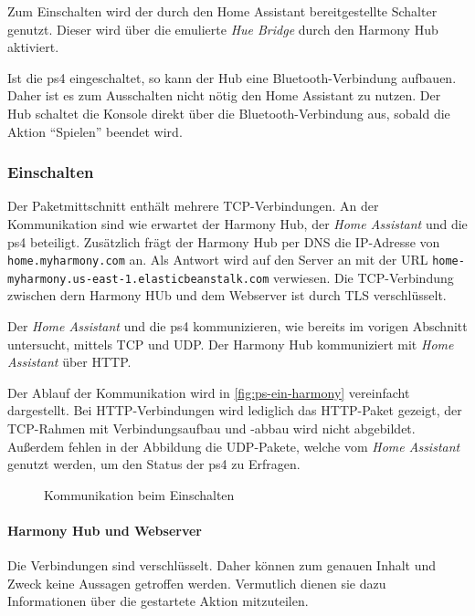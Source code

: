 Zum Einschalten wird der durch den Home Assistant bereitgestellte Schalter genutzt.
Dieser wird über die emulierte \textit{Hue Bridge} durch den Harmony Hub aktiviert.

Ist die \ac{ps4} eingeschaltet, so kann der Hub eine Bluetooth-Verbindung aufbauen.
Daher ist es zum Ausschalten nicht nötig den Home Assistant zu nutzen.
Der Hub schaltet die Konsole direkt über die Bluetooth-Verbindung aus,
sobald die Aktion \enquote{Spielen} beendet wird.

\subsubsection{Einschalten}
Der Paketmittschnitt enthält mehrere TCP-Verbindungen.
An der Kommunikation sind wie erwartet der Harmony Hub, der \textit{Home Assistant} und die \ac{ps4} beteiligt.
Zusätzlich frägt der Harmony Hub per DNS die IP-Adresse von \nolinkurl{home.myharmony.com} an.
Als Antwort wird auf den Server an mit der URL \nolinkurl{home-myharmony.us-east-1.elasticbeanstalk.com} verwiesen.
Die TCP-Verbindung zwischen dern Harmony HUb und dem Webserver ist durch TLS verschlüsselt.

Der \textit{Home Assistant} und die \ac{ps4} kommunizieren, wie bereits im vorigen Abschnitt untersucht, mittels TCP und UDP.
Der Harmony Hub kommuniziert mit \textit{Home Assistant} über HTTP.

Der Ablauf der Kommunikation wird in \autoref{fig:ps-ein-harmony} vereinfacht dargestellt.
Bei HTTP-Verbindungen wird lediglich das HTTP-Paket gezeigt,
der TCP-Rahmen mit Verbindungsaufbau und -abbau wird nicht abgebildet.
Außerdem fehlen in der Abbildung die UDP-Pakete,
welche vom \textit{Home Assistant} genutzt werden,
um den Status der \ac{ps4} zu Erfragen.

\begin{figure}
    \centering
    \resizebox{\textwidth}{!}{
        
    }
    \caption{Kommunikation beim Einschalten}
    \label{fig:ps-ein-harmony}
\end{figure}

\newpage



\paragraph{Harmony Hub und Webserver}
Die Verbindungen sind verschlüsselt.
Daher können zum genauen Inhalt und Zweck keine Aussagen getroffen werden.
Vermutlich dienen sie dazu Informationen über die gestartete Aktion mitzuteilen.

